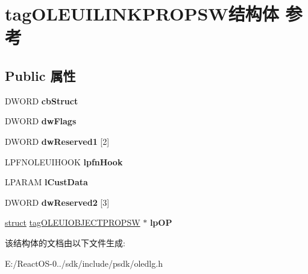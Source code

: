 \hypertarget{structtag_o_l_e_u_i_l_i_n_k_p_r_o_p_s_w}{}\section{tag\+O\+L\+E\+U\+I\+L\+I\+N\+K\+P\+R\+O\+P\+S\+W结构体 参考}
\label{structtag_o_l_e_u_i_l_i_n_k_p_r_o_p_s_w}
\subsection*{Public 属性}
\begin{DoxyCompactItemize}
\item 
\mbox{\label{structtag_o_l_e_u_i_l_i_n_k_p_r_o_p_s_w_ab75740efceccb677625614814a8d25d9}} 
D\+W\+O\+RD {\bfseries cb\+Struct}
\item 
\mbox{\label{structtag_o_l_e_u_i_l_i_n_k_p_r_o_p_s_w_a73408ab4d42a7813ece5c5b9d13cc6be}} 
D\+W\+O\+RD {\bfseries dw\+Flags}
\item 
\mbox{\label{structtag_o_l_e_u_i_l_i_n_k_p_r_o_p_s_w_a38b2ca4ee680adea0b42751e98841c6b}} 
D\+W\+O\+RD {\bfseries dw\+Reserved1} \mbox{[}2\mbox{]}
\item 
\mbox{\label{structtag_o_l_e_u_i_l_i_n_k_p_r_o_p_s_w_a41ded60dd4afcf95b9aee96840fdcb57}} 
L\+P\+F\+N\+O\+L\+E\+U\+I\+H\+O\+OK {\bfseries lpfn\+Hook}
\item 
\mbox{\label{structtag_o_l_e_u_i_l_i_n_k_p_r_o_p_s_w_a174196fa88b7f8b01a25c90ce3709f52}} 
L\+P\+A\+R\+AM {\bfseries l\+Cust\+Data}
\item 
\mbox{\label{structtag_o_l_e_u_i_l_i_n_k_p_r_o_p_s_w_a1c843d3ba9b70b976d27a3f9b717bb4a}} 
D\+W\+O\+RD {\bfseries dw\+Reserved2} \mbox{[}3\mbox{]}
\item 
\mbox{\label{structtag_o_l_e_u_i_l_i_n_k_p_r_o_p_s_w_a48abbe48e88a7e1d99bcf50c9bbb32ba}} 
\hyperlink{interfacestruct}{struct} \hyperlink{structtag_o_l_e_u_i_o_b_j_e_c_t_p_r_o_p_s_w}{tag\+O\+L\+E\+U\+I\+O\+B\+J\+E\+C\+T\+P\+R\+O\+P\+SW} $\ast$ {\bfseries lp\+OP}
\end{DoxyCompactItemize}


该结构体的文档由以下文件生成\+:\begin{DoxyCompactItemize}
\item 
E\+:/\+React\+O\+S-\/0../sdk/include/psdk/oledlg.\+h\end{DoxyCompactItemize}
